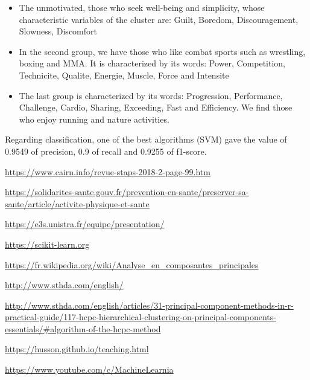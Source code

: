 \documentclass[12pt]{article}
\begin{document}
\begin{itemize}

\item The unmotivated, those who seek well-being and simplicity, whose characteristic variables of the cluster are:  Guilt, Boredom, Discouragement, Slowness, Discomfort 

\item In the second group, we have those who like combat sports such as wrestling, boxing and MMA. It is characterized by its words: Power, Competition, Technicite, Qualite, Energie, Muscle, Force and Intensite 

\item  The last group is characterized by its words: Progression, Performance, 
Challenge, Cardio, Sharing, Exceeding, Fast and Efficiency. 
We find those who enjoy running and nature activities. 

\end{itemize}

Regarding classification, one of the best algorithms (SVM) gave the value of 0.9549 of precision, 
0.9 of recall and 0.9255 of f1-score.


\begin{thebibliography}{9}

\url{https://www.cairn.info/revue-staps-2018-2-page-99.htm}


\url{https://solidarites-sante.gouv.fr/prevention-en-sante/preserver-sa-sante/article/activite-physique-et-sante}

\url{https://e3s.unistra.fr/equipe/presentation/}

\url{https://scikit-learn.org}

\bibitem{}
\url{https://fr.wikipedia.org/wiki/Analyse_en_composantes_principales}


\url{http://www.sthda.com/english/}

\url{http://www.sthda.com/english/articles/31-principal-component-methods-in-r-practical-guide/117-hcpc-hierarchical-clustering-on-principal-components-essentials/#algorithm-of-the-hcpc-method}


\url{https://husson.github.io/teaching.html}


\url{https://www.youtube.com/c/MachineLearnia}



\end{thebibliography}
\end{document}
